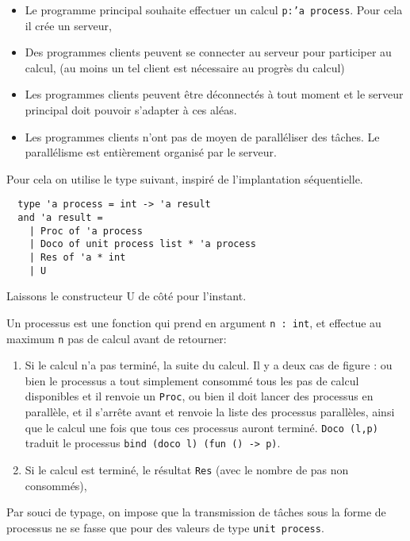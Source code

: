 \documentclass[11pt]{article}
\begin{document}
\begin{itemize}
  \item Le programme principal souhaite effectuer un calcul
    {\tt p:'a process}. Pour cela il cr\'ee un serveur,
  \item Des programmes clients peuvent se connecter au serveur pour
    participer au calcul,
    (au moins un tel client est n\'ecessaire au progr\`es du calcul)
  \item Les programmes clients peuvent \^etre d\'econnect\'es \`a tout moment
    et le serveur principal doit pouvoir s'adapter \`a ces al\'eas.
  \item Les programmes clients n'ont pas de moyen de parall\'eliser
    des t\^aches. Le parall\'elisme est enti\`erement organis\'e
    par le serveur.
\end{itemize}

Pour cela on utilise le type suivant, inspir\'e de l'implantation
s\'equentielle.

\begin{lstlisting}
  type 'a process = int -> 'a result
  and 'a result =
    | Proc of 'a process
    | Doco of unit process list * 'a process
    | Res of 'a * int
    | U
\end{lstlisting}

Laissons le constructeur U de c\^ot\'e pour l'instant.

Un processus est une fonction qui prend en argument {\tt n : int},
et effectue au maximum {\tt n} pas de calcul avant de retourner:

\begin{enumerate}
  \item Si le calcul n'a pas termin\'e, la suite du calcul.
    Il y a deux cas de figure : ou bien le processus a tout simplement
    consomm\'e tous les pas de calcul disponibles
    et il renvoie un {\tt Proc},
    ou bien il doit lancer des processus en parall\`ele, et il s'arr\^ete
    avant et renvoie la liste des processus parall\`eles,
    ainsi que le calcul une fois que tous ces processus auront termin\'e.
    {\tt Doco (l,p)} traduit le processus
    {\tt bind (doco l) (fun () -> p)}.
  \item Si le calcul est termin\'e, le r\'esultat {\tt Res}
    (avec le nombre de pas non consomm\'es),
\end{enumerate}

Par souci de typage, on impose que la transmission de
t\^aches sous la forme de processus ne se fasse que pour des valeurs
de type {\tt unit process}.
\end{document}
